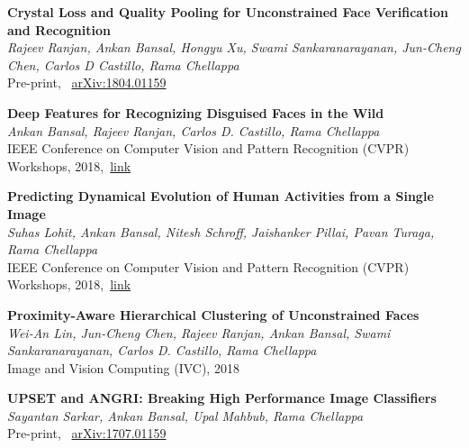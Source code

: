 \documentclass[11pt, a4paper]{article}
\begin{document}
\vspace{3pt}

\textbf{Crystal Loss and Quality Pooling for Unconstrained Face Verification and Recognition} \\
\textit{Rajeev Ranjan, Ankan Bansal, Hongyu Xu, Swami Sankaranarayanan, Jun-Cheng Chen, Carlos D
Castillo, Rama Chellappa}\\
Pre-print, ~\href{https://arxiv.org/abs/1804.01159}{arXiv:1804.01159}

\vspace{3pt}

\textbf{Deep Features for Recognizing Disguised Faces in the Wild} \\
\textit{Ankan Bansal, Rajeev Ranjan, Carlos D. Castillo, Rama Chellappa}\\
IEEE Conference on Computer Vision and Pattern Recognition (CVPR) Workshops,
2018,~\href{http://openaccess.thecvf.com/content_cvpr_2018_workshops/w1/html/Bansal_Deep_Features_for_CVPR_2018_paper.html}{link}

\vspace{3pt}

\textbf{Predicting Dynamical Evolution of Human Activities from a Single Image} \\
\textit{Suhas Lohit, Ankan Bansal, Nitesh Schroff, Jaishanker Pillai, Pavan Turaga, Rama
Chellappa}\\
IEEE Conference on Computer Vision and Pattern Recognition (CVPR) Workshops,
2018,~\href{http://openaccess.thecvf.com/content_cvpr_2018_workshops/w10/html/Lohit_Predicting_Dynamical_Evolution_CVPR_2018_paper.html}{link}

\vspace{3pt}

\textbf{Proximity-Aware Hierarchical Clustering of Unconstrained Faces} \\
\textit{Wei-An Lin, Jun-Cheng Chen, Rajeev Ranjan, Ankan Bansal, Swami Sankaranarayanan, Carlos D.
Castillo, Rama Chellappa}\\
Image and Vision Computing (IVC), 2018

\vspace{3pt}

\textbf{UPSET and ANGRI: Breaking High Performance Image Classifiers} \\
\textit{Sayantan Sarkar, Ankan Bansal, Upal Mahbub, Rama Chellappa}\\
Pre-print, ~\href{https://arxiv.org/abs/1707.01159}{arXiv:1707.01159}
\end{document}
